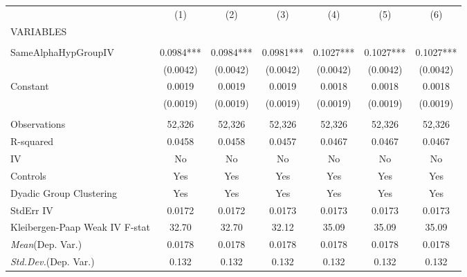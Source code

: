 \documentclass[]{article}
\begin{document}
\begin{tabular}{lcccccc} \hline
 & (1) & (2) & (3) & (4) & (5) & (6) \\
VARIABLES &  &  &  &  &  &  \\ \hline
 &  &  &  &  &  &  \\
SameAlphaHypGroupIV & 0.0984*** & 0.0984*** & 0.0981*** & 0.1027*** & 0.1027*** & 0.1027*** \\
 & (0.0042) & (0.0042) & (0.0042) & (0.0042) & (0.0042) & (0.0042) \\
Constant & 0.0019 & 0.0019 & 0.0019 & 0.0018 & 0.0018 & 0.0018 \\
 & (0.0019) & (0.0019) & (0.0019) & (0.0019) & (0.0019) & (0.0019) \\
 &  &  &  &  &  &  \\
Observations & 52,326 & 52,326 & 52,326 & 52,326 & 52,326 & 52,326 \\
R-squared & 0.0458 & 0.0458 & 0.0457 & 0.0467 & 0.0467 & 0.0467 \\
IV & No & No & No & No & No & No \\
Controls & Yes & Yes & Yes & Yes & Yes & Yes \\
Dyadic Group Clustering & Yes & Yes & Yes & Yes & Yes & Yes \\
StdErr IV & 0.0172 & 0.0172 & 0.0173 & 0.0173 & 0.0173 & 0.0173 \\
Kleibergen-Paap Weak IV F-stat & 32.70 & 32.70 & 32.12 & 35.09 & 35.09 & 35.09 \\
\textit{Mean}(Dep. Var.) & 0.0178 & 0.0178 & 0.0178 & 0.0178 & 0.0178 & 0.0178 \\
 \textit{Std.Dev.}(Dep. Var.) & 0.132 & 0.132 & 0.132 & 0.132 & 0.132 & 0.132 \\ \hline
\end{tabular}
\end{document}
